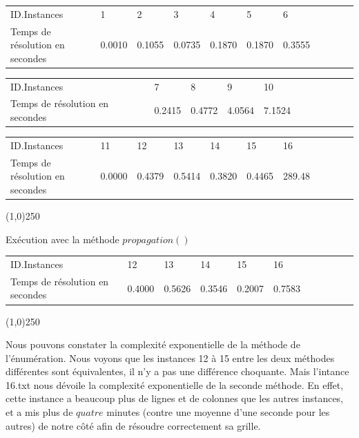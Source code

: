 \documentclass[a4paper,12pt]{article}
\begin{document}
\begin{table}[hbt!]
\centering
\begin{tabular}{|l|l|l|l|l|l|l|l|l|l|l|}
ID.Instances           & 1      & 2      & 3      & 4      & 5     & 6\\
Temps de résolution en secondes & 0.0010 & 0.1055 & 0.0735 & 0.1870 & 0.1870 & 0.3555
\end{tabular}
\end{table}

\begin{table}[hbt!]
\centering
\begin{tabular}{|l|l|l|l|l|l|l|l|l|l|l|}
ID.Instances      & 7      & 8      & 9      & 10      \\
Temps de résolution en secondes & 0.2415 & 0.4772 & 4.0564 & 7.1524 
\end{tabular}
\end{table}

\begin{table}[hbt!]
\centering
\begin{tabular}{|l|l|l|l|l|l|l|l|l|l|l|}
ID.Instances           & 11      & 12      & 13      & 14      & 15      & 16       \\
Temps de résolution en secondes &  0.0000 & 0.4379 & 0.5414 & 0.3820 & 0.4465 & 289.48
\end{tabular}
\end{table}

 \begin{center}
   \line(1,0){250}
 \end{center}

\begin{center}Exécution avec la méthode $propagation()$\end{center}

\begin{table}[hbt!]
\centering
\begin{tabular}{|l|l|l|l|l|l|l|l|l|l|l|}
ID.Instances      & 12      & 13      & 14      & 15      & 16       \\
Temps de résolution en secondes & 0.4000 & 0.5626 & 0.3546 & 0.2007 & 0.7583
\end{tabular}
\end{table}

 \begin{center}
   \line(1,0){250}
 \end{center}

Nous pouvons constater la complexité exponentielle de la méthode de l'énumération. Nous voyons que les instances 12 à 15 entre les deux méthodes différentes sont équivalentes, il n'y a pas une différence choquante. Mais l'intance 16.txt nous dévoile la complexité exponentielle de la seconde méthode. En effet, cette instance a beaucoup plus de lignes et de colonnes que les autres instances, et a mis plus de $quatre$ minutes (contre une moyenne d'une seconde pour les autres) de notre côté afin de résoudre correctement sa grille.
\end{document}
